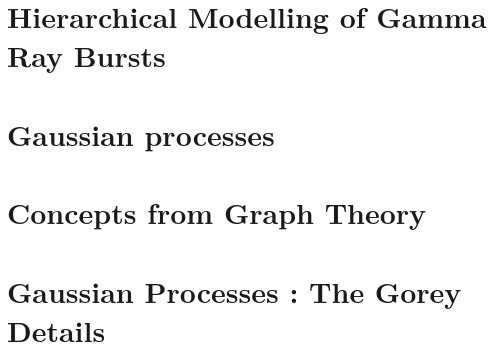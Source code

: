 \documentclass{kentigern}
\theoremstyle{definition}
\begin{document}
\chapter{Hierarchical Modelling of Gamma Ray Bursts}
\label{cha:gamma-ray-burst}



\chapter{Gaussian processes}
\label{cha:gaussian-process}




\appendices

\chapter{Concepts from Graph Theory}
\label{chap:graph-theory}

\chapter{Gaussian Processes : The Gorey Details}
\label{chap:gp-details}






%

\glsaddall
\printglossaries
\end{document}
